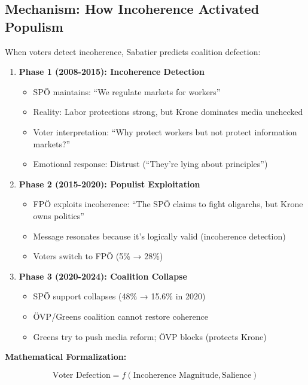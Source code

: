 \subsection{Mechanism: How Incoherence Activated Populism}

When voters detect incoherence, Sabatier predicts coalition defection:

\begin{enumerate}

\item \textbf{Phase 1 (2008-2015): Incoherence Detection}
\begin{itemize}
\item SPÖ maintains: ``We regulate markets for workers''
\item Reality: Labor protections strong, but Krone dominates media unchecked
\item Voter interpretation: ``Why protect workers but not protect information markets?''
\item Emotional response: Distrust (``They're lying about principles'')
\end{itemize}

\item \textbf{Phase 2 (2015-2020): Populist Exploitation}
\begin{itemize}
\item FPÖ exploits incoherence: ``The SPÖ claims to fight oligarchs, but Krone owns politics''
\item Message resonates because it's logically valid (incoherence detection)
\item Voters switch to FPÖ (5\% → 28\%)
\end{itemize}

\item \textbf{Phase 3 (2020-2024): Coalition Collapse}
\begin{itemize}
\item SPÖ support collapses (48\% → 15.6\% in 2020)
\item ÖVP/Greens coalition cannot restore coherence
\item Greens try to push media reform; ÖVP blocks (protects Krone)
\end{itemize}

\end{enumerate}

\textbf{Mathematical Formalization:}

\begin{equation}
\text{Voter Defection} = f(\text{Incoherence Magnitude}, \text{Salience})
\end{equation}


